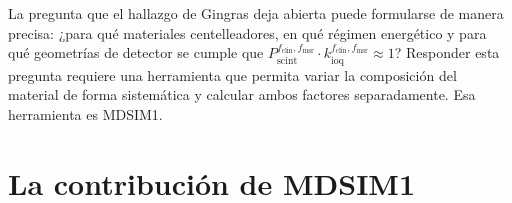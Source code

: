 \documentclass[11pt,a4paper]{article}
\begin{document}
La pregunta que el hallazgo de Gingras deja abierta puede formularse de manera precisa: ¿para qué materiales centelleadores, en qué régimen energético y para qué geometrías de detector se cumple que $P_{\mathrm{scint}}^{f_{\mathrm{clin}},f_{\mathrm{msr}}} \cdot k_{\mathrm{ioq}}^{f_{\mathrm{clin}},f_{\mathrm{msr}}} \approx 1$? Responder esta pregunta requiere una herramienta que permita variar la composición del material de forma sistemática y calcular ambos factores separadamente. Esa herramienta es MDSIM1.

\section{La contribución de MDSIM1}



\end{document}
